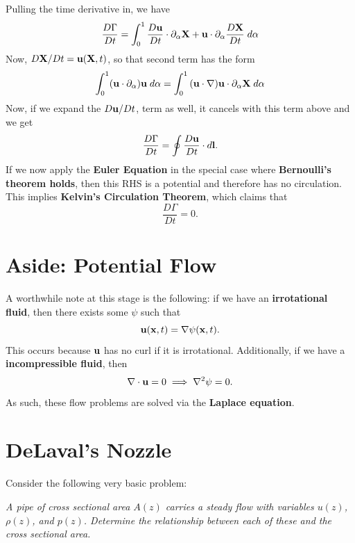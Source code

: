 Pulling the time derivative in, we have
\[
\frac{D\Gamma}{Dt} = \int_0^1 \frac{D{\bf u}}{Dt} \cdot \partial_\alpha {\bf X} + {\bf u} \cdot \partial_\alpha\frac{D{\bf X}}{Dt} \; d\alpha
\]
Now, $D{\bf X}/Dt = {\bf u}({\bf X},t)$, so that second term has the form
\[
\int_0^1 ({\bf u} \cdot \partial_\alpha){\bf u} \;d\alpha = \int_0^1 {\bf (u \cdot \nabla){\bf u} \cdot \partial_\alpha {\bf X}}\; d\alpha
\]
Now, if we expand the $D{\bf u}/Dt$, term as well, it cancels with this term above and we get
\[
\frac{D\Gamma}{Dt} = \oint \frac{D{\bf u}}{Dt} \cdot d{\bf l}.
\]
If we now apply the \textbf{Euler Equation} in the special case where \textbf{Bernoulli's theorem holds}, then this RHS is a potential and therefore has no circulation. This implies \textbf{Kelvin's Circulation Theorem}, which claims that 
\[
\frac{D\Gamma}{Dt} = 0.
\]

\section{Aside: Potential Flow}

A worthwhile note at this stage is the following: if we have an \textbf{irrotational fluid}, then there exists some $\psi$ such that
\[
{\bf u}({\bf x},t) = \nabla \psi({\bf x},t).
\]
This occurs because ${\bf u}$ has no curl if it is irrotational. Additionally, if we have a \textbf{incompressible fluid}, then
\[
\nabla \cdot {\bf u} = 0 \implies \nabla^2 \psi = 0.
\]
As such, these flow problems are solved via the \textbf{Laplace equation}.

\section{DeLaval's Nozzle}

Consider the following very basic problem:
\begin{center}
\textit{A pipe of cross sectional area $A(z)$ carries a steady flow with variables $u(z)$, $\rho(z)$, and $p(z)$. Determine the relationship between each of these and the cross sectional area.}
\end{center}

